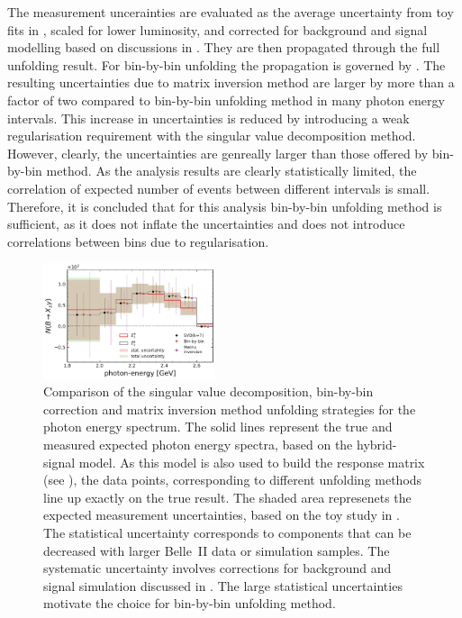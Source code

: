 The measurement uncerainties are evaluated as the average uncertainty from toy fits in , scaled for lower luminosity, and corrected for background and signal modelling based on discussions in .
They are then propagated through the full unfolding result.
For bin-by-bin unfolding the propagation is governed by .
The resulting uncertainties due to matrix inversion method are larger by more than a factor of two compared to bin-by-bin unfolding method in many photon energy intervals.
This increase in uncertainties is reduced by introducing a weak regularisation requirement with the singular value decomposition method.
However, clearly, the uncertainties are genreally larger than those offered by bin-by-bin method.
As the analysis results are clearly statistically limited, the correlation of expected number of events between different \EB intervals is small.
Therefore, it is concluded that for this analysis bin-by-bin unfolding method is sufficient, as it does not inflate the uncertainties and does not introduce correlations between bins due to regularisation.

\begin{figure}[htbp!]
    \centering
    \includegraphics[width=0.45\textwidth]{figures/signal_validation/bin_by_bin_svd_comparison_cov_mtx.pdf}
    \caption{\label{fig:unfolding_comparison}
    Comparison of the singular value decomposition, bin-by-bin correction and matrix inversion method unfolding strategies
    for the photon energy spectrum.
    The solid lines represent the true and measured expected photon energy spectra, based on the hybrid-signal model.
    As this model is also used to build the response matrix (see ), the data points, corresponding to different unfolding methods 
    line up exactly on the true result.
    The shaded area represenets the expected measurement uncertainties, based on the toy study in .
    The statistical uncertainty corresponds to components that can be decreased with larger Belle~II data or simulation samples.
    The systematic uncertainty involves corrections for background and signal simulation discussed in .
    The large statistical uncertainties motivate the choice for bin-by-bin unfolding method.
    }
\end{figure}

